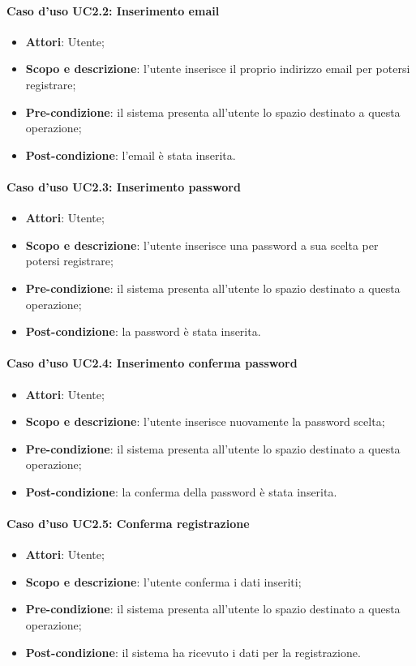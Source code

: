 \paragraph{Caso d'uso UC2.2: Inserimento email}
\begin{itemize}
\item \textbf{Attori}: Utente;
\item \textbf{Scopo e descrizione}: l'utente inserisce il proprio indirizzo email per potersi registrare;
\item \textbf{Pre-condizione}: il sistema presenta all'utente lo spazio destinato a questa operazione;
\item \textbf{Post-condizione}: l'email è stata inserita.
\end{itemize}

\paragraph{Caso d'uso UC2.3: Inserimento password}
\begin{itemize}
\item \textbf{Attori}: Utente;
\item \textbf{Scopo e descrizione}: l'utente inserisce una password a sua scelta per potersi registrare;
\item \textbf{Pre-condizione}: il sistema presenta all'utente lo spazio destinato a questa operazione;
\item \textbf{Post-condizione}: la password è stata inserita.
\end{itemize}

\paragraph{Caso d'uso UC2.4: Inserimento conferma password}
\begin{itemize}
\item \textbf{Attori}: Utente;
\item \textbf{Scopo e descrizione}: l'utente inserisce nuovamente la password scelta;
\item \textbf{Pre-condizione}: il sistema presenta all'utente lo spazio destinato a questa operazione;
\item \textbf{Post-condizione}: la conferma della password è stata inserita.
\end{itemize}

\paragraph{Caso d'uso UC2.5: Conferma registrazione}
\begin{itemize}
\item \textbf{Attori}: Utente;
\item \textbf{Scopo e descrizione}: l'utente conferma i dati inseriti;
\item \textbf{Pre-condizione}: il sistema presenta all'utente lo spazio destinato a questa operazione;
\item \textbf{Post-condizione}: il sistema ha ricevuto i dati per la registrazione.
\end{itemize}

